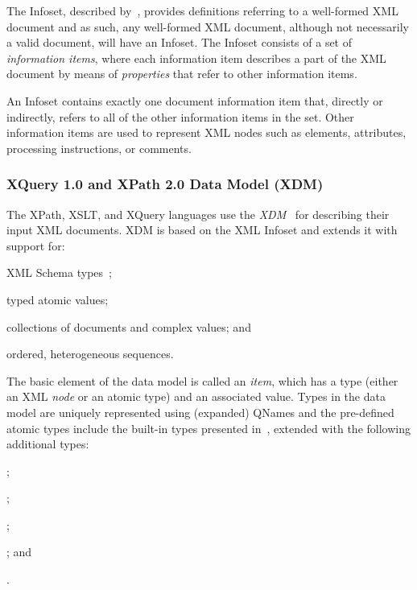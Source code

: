 The \acl{Infoset}, described by~\citet{CowanTobin:2004aa}, provides definitions referring to a well-formed \ac{XML} document
and as such, any well-formed \ac{XML} document, although not necessarily a valid document, will have an \ac{Infoset}.
%
The \ac{Infoset} consists of a set of \emph{information items}, where each information item describes a part of the \ac{XML}
document by means of \emph{properties} that refer to other information items.
%

An \ac{Infoset} contains exactly one document information item that, directly or indirectly, refers to all of the other
information items in the set.  Other information items are used to represent \ac{XML} nodes such as elements,
attributes, processing instructions, or comments.


\subsubsection{XQuery 1.0 and XPath 2.0 Data Model (XDM)}
\label{sec:xpath-data-model}
%
The XPath, XSLT, and XQuery languages use the \emph{\acf{XDM}}~\cite{FernandezMalhotraMarsh:2010aa} for describing their
input \ac{XML} documents.  \ac{XDM} is based on the \ac{XML} \ac{Infoset} and extends it with support for:
%
\begin{inparaenum}[(i)]
\item \ac{XML} Schema types~\cite{ThompsonBeechMaloney:2004aa,BironMalhotra:2004aa};
\item typed atomic values; 
\item collections of documents and complex values; and
\item ordered, heterogeneous sequences.
\end{inparaenum}

The basic element of the data model is called an \emph{item}, which has a type (either an \ac{XML} \emph{node} or an
atomic type) and an associated value.
%
Types in the data model are uniquely represented using (expanded) QNames %
and the pre-defined atomic types include the built-in types presented in~\citet{BironMalhotra:2004aa}, extended with the
following additional types:
%
\begin{inparaenum}[(i)]
\item {};
\item {};
\item {};
\item {}; and
\item {}.
\end{inparaenum}


